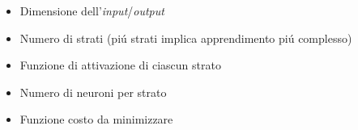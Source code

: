 \begin{frame}[t,fragile]
{{{\begin{minipage}[t]{\textwidth}
\begin{minipage}[t]{.5\textwidth}
\begin{itemize}[leftmargin=10pt,align=right]
\begin{itemize}[leftmargin=20pt,align=right]
								\item[\alert{\faHandORight}] Dimensione dell'\emph{input}/\emph{output}
			 					\item[\alert{\faHandORight}] Numero di strati (pi\'{u} strati implica apprendimento pi\'{u} complesso)
								\item[\alert{\faHandORight}] Funzione di attivazione di ciascun strato
								\item[\alert{\faHandORight}] Numero di neuroni per strato
								\item[\alert{\faHandORight}] Funzione costo da minimizzare
							\end{itemize}
					\end{itemize}
				\end{minipage}
		\end{minipage}
		}
	}
}
\end{frame}
%
